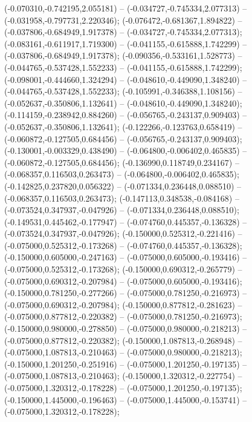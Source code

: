  (-0.070310,-0.742195,2.055181) -- (-0.034727,-0.745334,2.077313) -- (-0.031958,-0.797731,2.220346);
 (-0.076472,-0.681367,1.894822) -- (-0.037806,-0.684949,1.917378) -- (-0.034727,-0.745334,2.077313);
 (-0.083161,-0.611917,1.719300) -- (-0.041155,-0.615888,1.742299) -- (-0.037806,-0.684949,1.917378);
 (-0.090356,-0.533161,1.528773) -- (-0.044765,-0.537428,1.552233) -- (-0.041155,-0.615888,1.742299);
 (-0.098001,-0.444660,1.324294) -- (-0.048610,-0.449090,1.348240) -- (-0.044765,-0.537428,1.552233);
 (-0.105991,-0.346388,1.108156) -- (-0.052637,-0.350806,1.132641) -- (-0.048610,-0.449090,1.348240);
 (-0.114159,-0.238942,0.884260) -- (-0.056765,-0.243137,0.909403) -- (-0.052637,-0.350806,1.132641);
 (-0.122266,-0.123763,0.658419) -- (-0.060872,-0.127505,0.684456) -- (-0.056765,-0.243137,0.909403);
 (-0.130001,-0.003329,0.438490) -- (-0.064800,-0.006402,0.465835) -- (-0.060872,-0.127505,0.684456);
 (-0.136990,0.118749,0.234167) -- (-0.068357,0.116503,0.263473) -- (-0.064800,-0.006402,0.465835);
 (-0.142825,0.237820,0.056322) -- (-0.071334,0.236448,0.088510) -- (-0.068357,0.116503,0.263473);
 (-0.147113,0.348538,-0.084168) -- (-0.073524,0.347937,-0.047926) -- (-0.071334,0.236448,0.088510);
 (-0.149531,0.445462,-0.177947) -- (-0.074760,0.445357,-0.136328) -- (-0.073524,0.347937,-0.047926);
 (-0.150000,0.525312,-0.221416) -- (-0.075000,0.525312,-0.173268) -- (-0.074760,0.445357,-0.136328);
 (-0.150000,0.605000,-0.247163) -- (-0.075000,0.605000,-0.193416) -- (-0.075000,0.525312,-0.173268);
 (-0.150000,0.690312,-0.265779) -- (-0.075000,0.690312,-0.207984) -- (-0.075000,0.605000,-0.193416);
 (-0.150000,0.781250,-0.277266) -- (-0.075000,0.781250,-0.216973) -- (-0.075000,0.690312,-0.207984);
 (-0.150000,0.877812,-0.281623) -- (-0.075000,0.877812,-0.220382) -- (-0.075000,0.781250,-0.216973);
 (-0.150000,0.980000,-0.278850) -- (-0.075000,0.980000,-0.218213) -- (-0.075000,0.877812,-0.220382);
 (-0.150000,1.087813,-0.268948) -- (-0.075000,1.087813,-0.210463) -- (-0.075000,0.980000,-0.218213);
 (-0.150000,1.201250,-0.251916) -- (-0.075000,1.201250,-0.197135) -- (-0.075000,1.087813,-0.210463);
 (-0.150000,1.320312,-0.227754) -- (-0.075000,1.320312,-0.178228) -- (-0.075000,1.201250,-0.197135);
 (-0.150000,1.445000,-0.196463) -- (-0.075000,1.445000,-0.153741) -- (-0.075000,1.320312,-0.178228);
